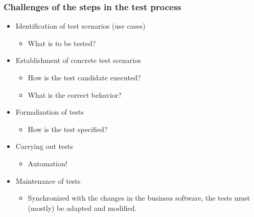 
\begin{frame}
\frametitle{Challenges of the steps in the test process}
    \begin{itemize}
    \item Identification of test scenarios (use cases)
         \begin{itemize}\item What is to be tested?
         \end{itemize} 
    \item Establishment of concrete test scenarios
          \begin{itemize}
           \item How is the test candidate executed?
           \item What is the correct behavior?
          \end{itemize} 
    \item Formalization of tests 
         \begin{itemize}\item How is the test specified? 
         \end{itemize} 
    \item Carrying out tests 
         \begin{itemize}\item Automation!
         \end{itemize} 
    \item Maintenance of tests
         \begin{itemize}\item Synchronized with the changes in the business software, the tests must (mostly) be adapted and modified.
         \end{itemize} 
    \end{itemize}
\end{frame}


